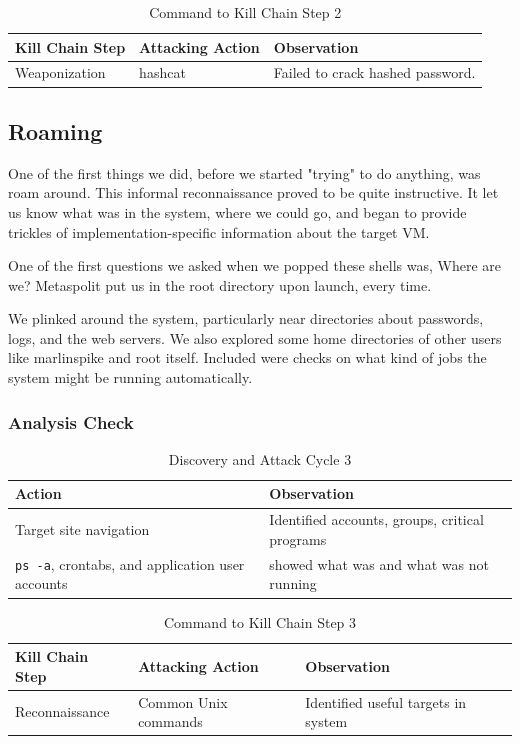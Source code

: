 \begin{table}[H]
\caption{Command to Kill Chain Step 2}
\centering
\begin{tabular}{|l|l|l|}
\hline
Kill Chain Step & Attacking Action & Observation \\
\hline
Weaponization & hashcat & Failed to crack hashed \gls{password}. \\
\hline
\end{tabular}
\end{table}

\subsection{Roaming}
One of the first things we did, before we started "trying" to do anything, was roam around.  This informal reconnaissance proved to be quite instructive.  It let us know what was in the system, where we could go, and began to provide trickles of implementation-specific information about the target VM.

One of the first questions we asked when we popped these shells was, Where are we?  Metaspolit put us in the root directory upon launch, every time.


We plinked around the system, particularly near directories about passwords, logs, and the web servers.  We also explored some home directories of other users like marlinspike and root itself.  Included were checks on what kind of jobs the system might be running automatically.  



\subsubsection{Analysis Check}
\begin{table}[H]
\caption{Discovery and Attack Cycle 3}
\centering
\begin{tabular}{|l|l|}
\hline
Action & Observation \\
\hline
Target site navigation & Identified accounts, groups, critical programs \\
\texttt{ps -a}, crontabs, and application user accounts & showed what was and what was not running \\
\hline
\end{tabular}
\end{table}

\begin{table}[H]
\caption{Command to Kill Chain Step 3}
\centering
\begin{tabular}{|l|l|l|}
\hline
Kill Chain Step & Attacking Action & Observation \\
\hline
Reconnaissance & Common Unix commands & Identified useful targets in system \\
\hline
\end{tabular}
\end{table}

